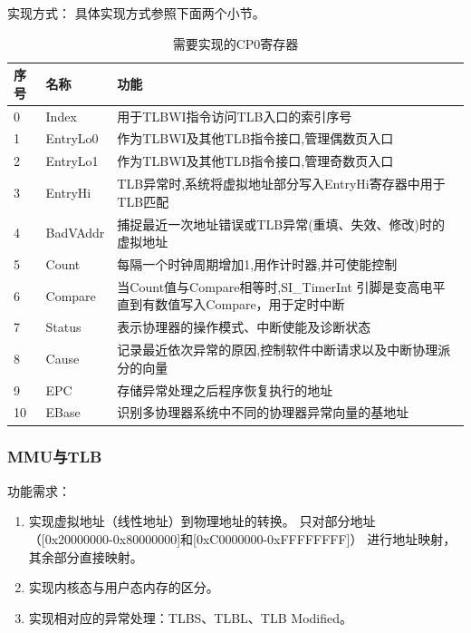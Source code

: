             实现方式：
            具体实现方式参照下面两个小节。

            \begin{table}[!hbp]
            \centering
            \caption{需要实现的CP0寄存器}
            \begin{tabularx}{\textwidth}{|l|l|X|}
            \hline
            序号 & 名称 & 功能 \\
            \hline
            0 & Index & 用于TLBWI指令访问TLB入口的索引序号 \\
            \hline
            1 & EntryLo0 & 作为TLBWI及其他TLB指令接口,管理偶数页入口 \\
            \hline
            2 & EntryLo1 & 作为TLBWI及其他TLB指令接口,管理奇数页入口 \\
            \hline
            3 & EntryHi & TLB异常时,系统将虚拟地址部分写入EntryHi寄存器中用于TLB匹配 \\
            \hline
            4 & BadVAddr & 捕捉最近一次地址错误或TLB异常(重填、失效、修改)时的虚拟地址 \\
            \hline
            5 & Count & 每隔一个时钟周期增加1,用作计时器,并可使能控制 \\
            \hline
            6 & Compare & 当Count值与Compare相等时,SI\_TimerInt 引脚是变高电平直到有数值写入Compare，用于定时中断 \\
            \hline
            7 & Status & 表示协理器的操作模式、中断使能及诊断状态 \\
            \hline
            8 & Cause & 记录最近依次异常的原因,控制软件中断请求以及中断协理派分的向量 \\
            \hline
            9 & EPC & 存储异常处理之后程序恢复执行的地址 \\
            \hline
            10 & EBase & 识别多协理器系统中不同的协理器异常向量的基地址 \\
            \hline
            \end{tabularx}
            \end{table}

        \subsubsection{MMU与TLB}
            功能需求：
            \begin{enumerate}
            \item
                实现虚拟地址（线性地址）到物理地址的转换。%
                只对部分地址%
                （[0x20000000-0x80000000]和[0xC0000000-0xFFFFFFFF]）%
                进行地址映射，其余部分直接映射。
            \item
                实现内核态与用户态内存的区分。
            \item
                实现相对应的异常处理：TLBS、TLBL、TLB Modified。
            \end{enumerate}

